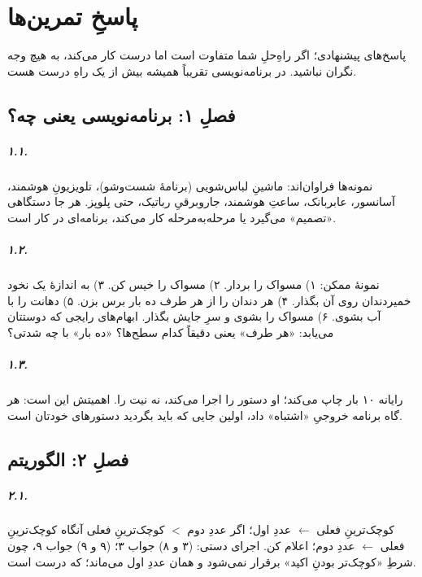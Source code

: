 \chapter{پاسخِ تمرین‌ها}%
\label{app:solutions}

پاسخ‌های پیشنهادی؛ اگر راهِ‌حلِ شما متفاوت است اما درست کار می‌کند، به
هیچ وجه نگران نباشید. در برنامه‌نویسی تقریباً همیشه بیش از یک راهِ درست
هست.

\section*{فصلِ ۱: برنامه‌نویسی یعنی چه؟}

\paragraph{۱.۱.} نمونه‌ها فراوان‌اند: ماشینِ لباس‌شویی (برنامهٔ شست‌وشو)،
تلویزیونِ هوشمند، آسانسور، عابربانک، ساعتِ هوشمند، جاروبرقیِ رباتیک، حتی
پلوپز. هر جا دستگاهی «تصمیم» می‌گیرد یا مرحله‌به‌مرحله کار می‌کند،
برنامه‌ای در کار است.

\paragraph{۱.۲.} نمونهٔ ممکن: ۱) مسواک را بردار. ۲) مسواک را خیس کن. %
۳) به اندازهٔ یک نخود خمیردندان روی آن بگذار. ۴) هر دندان را از هر طرف %
ده بار برس بزن. ۵) دهانت را با آب بشوی. ۶) مسواک را بشوی و سرِ جایش %
بگذار. ابهام‌های رایجی که دوستتان می‌یابد: «هر طرف» یعنی دقیقاً کدام
سطح‌ها؟ «ده بار» با چه شدتی؟

\paragraph{۱.۳.} رایانه ۱۰ بار چاپ می‌کند؛ او دستور را اجرا می‌کند، نه
نیت را. اهمیتش این است: هر گاه برنامه خروجیِ «اشتباه» داد، اولین جایی که
باید بگردید دستورهای خودتان است.

\section*{فصلِ ۲: الگوریتم}

\paragraph{۲.۱.} کوچک‌ترینِ فعلی $\leftarrow$ عددِ اول؛ اگر عددِ دوم $<$
کوچک‌ترینِ فعلی آنگاه کوچک‌ترینِ فعلی $\leftarrow$ عددِ دوم؛ اعلام کن.
اجرای دستی: (۳ و ۸) جواب ۳؛ (۹ و ۹) جواب ۹، چون شرطِ «کوچک‌تر بودنِ اکید»
برقرار نمی‌شود و همان عددِ اول می‌ماند؛ که درست است.

